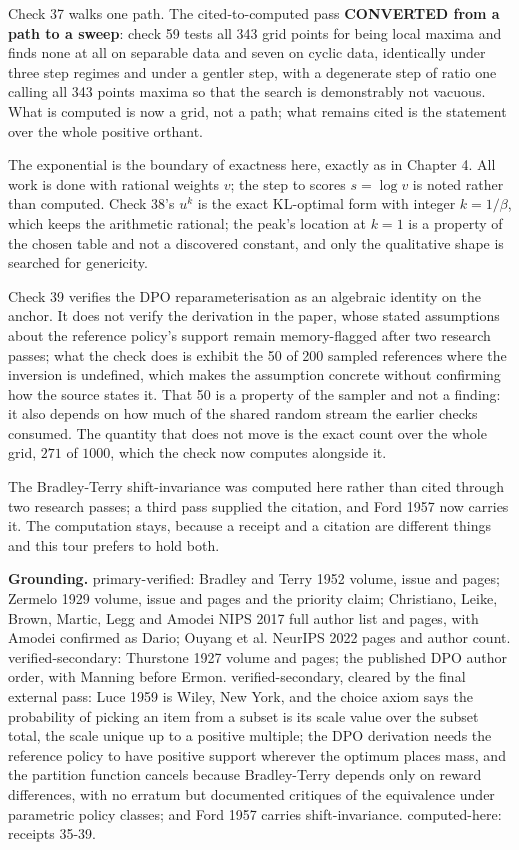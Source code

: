 Check 37 walks one path. The cited-to-computed pass \textbf{CONVERTED from a path to a sweep}: check 59 tests all 343 grid points for being local maxima and finds none at all on separable data and seven on cyclic data, identically under three step regimes and under a gentler step, with a degenerate step of ratio one calling all 343 points maxima so that the search is demonstrably not vacuous. What is computed is now a grid, not a path; what remains cited is the statement over the whole positive orthant.

The exponential is the boundary of exactness here, exactly as in Chapter 4. All work is done with rational weights $v$; the step to scores $s = \log v$ is noted rather than computed. Check 38's $u^k$ is the exact KL-optimal form with integer $k = 1/\beta$, which keeps the arithmetic rational; the peak's location at $k=1$ is a property of the chosen table and not a discovered constant, and only the qualitative shape is searched for genericity.

Check 39 verifies the DPO reparameterisation as an algebraic identity on the anchor. It does not verify the derivation in the paper, whose stated assumptions about the reference policy's support remain memory-flagged after two research passes; what the check does is exhibit the 50 of 200 sampled references where the inversion is undefined, which makes the assumption concrete without confirming how the source states it. That 50 is a property of the sampler and not a finding: it also depends on how much of the shared random stream the earlier checks consumed. The quantity that does not move is the exact count over the whole grid, $271$ of $1000$, which the check now computes alongside it.

The Bradley-Terry shift-invariance was computed here rather than cited through two research passes; a third pass supplied the citation, and Ford 1957 now carries it. The computation stays, because a receipt and a citation are different things and this tour prefers to hold both.

\textbf{Grounding.} primary-verified: Bradley and Terry 1952 volume, issue and pages; Zermelo 1929 volume, issue and pages and the priority claim; Christiano, Leike, Brown, Martic, Legg and Amodei NIPS 2017 full author list and pages, with Amodei confirmed as Dario; Ouyang et al. NeurIPS 2022 pages and author count. verified-secondary: Thurstone 1927 volume and pages; the published DPO author order, with Manning before Ermon. verified-secondary, cleared by the final external pass: Luce 1959 is Wiley, New York, and the choice axiom says the probability of picking an item from a subset is its scale value over the subset total, the scale unique up to a positive multiple; the DPO derivation needs the reference policy to have positive support wherever the optimum places mass, and the partition function cancels because Bradley-Terry depends only on reward differences, with no erratum but documented critiques of the equivalence under parametric policy classes; and Ford 1957 carries shift-invariance. computed-here: receipts 35-39.

